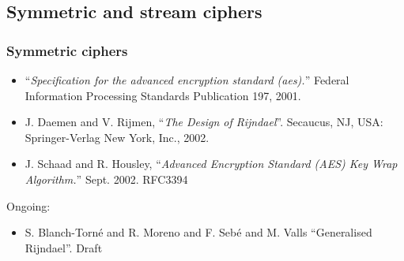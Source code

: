 \documentclass{beamer}
\begin{document}
% 

\subsection{Symmetric and stream ciphers}

\begin{frame}
\frametitle{Symmetric ciphers}
    \begin{itemize}
        \item ``\emph{Specification for the advanced encryption standard (aes).}'' Federal Information Processing Standards Publication 197, 2001.\cite{AES-FIPS}
        \item J. Daemen and V. Rijmen, ``\emph{The Design of Rijndael}''. Secaucus, NJ, USA: Springer-Verlag New York, Inc., 2002. \cite{Daemen:2002:DR:560131}
        \item J. Schaad and R. Housley, ``\emph{Advanced Encryption Standard (AES) Key Wrap Algorithm.}'' Sept. 2002. RFC3394 \cite{rfc3394}
    \end{itemize}
    Ongoing:
    \begin{itemize}
        \item S. Blanch-Torn\'e and R. Moreno and F. Seb\'e and M. Valls ``Generalised Rijndael''. Draft \cite{gRijndael}
    \end{itemize}
\end{frame}
\end{document}
